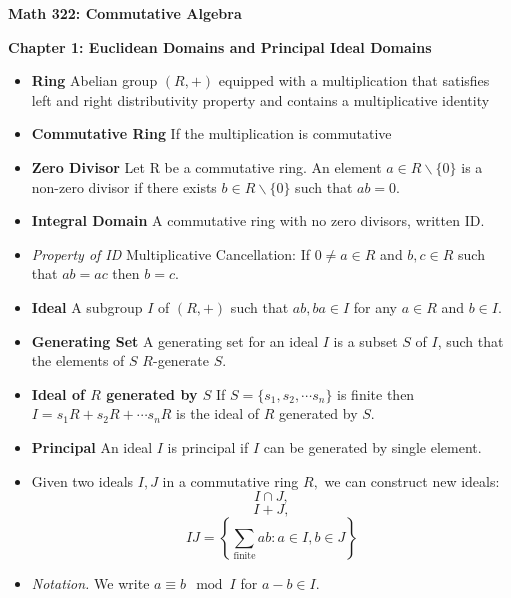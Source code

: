 \documentclass[a4paper, 12pt]
{article}
\begin{document}
	\textbf{Math 322: Commutative Algebra}
	
	\hfill


	\textbf{Chapter 1: Euclidean Domains and Principal Ideal Domains}

	\hfill
	
	\begin{itemize}
		\item \textbf{Ring} Abelian group $(R,+)$ equipped with a multiplication that satisfies left and right distributivity property and contains a  multiplicative identity
		
		\item \textbf{Commutative Ring} If the multiplication is commutative
		
		\item \textbf{Zero Divisor} Let R be a commutative ring. An element $a \in R \backslash \{0\}$ is a non-zero divisor if there exists $b \in R \backslash \{0\}$ such that $ab=0.$
		
		\item \textbf{Integral Domain} A commutative ring with no zero divisors, written ID.  
		
		\item\textit{ Property of ID} Multiplicative Cancellation:
		If $0 \not = a \in R$ and $b,c \in R$ such that $ab=ac$ then $b=c.$
		
		\item \textbf{Ideal} A subgroup $I$ of $(R,+)$ such that $ab, ba \in I$ for any $a \in R$ and $b \in I. $
		
		\item \textbf{Generating Set} A generating set for an ideal $I$ is a subset $S$ of $I$, such that the elements of $S$ $R$-generate $S.$
		
		\item \textbf{Ideal of $R$ generated by $S$} If $S=\{s_1, s_2, \cdots s_n\}$ is finite then $I=s_1R + s_2R + \cdots s_nR$ is the ideal of $R$ generated by $S.$
		
		\item \textbf{Principal} An ideal $I$ is principal if $I$ can be generated by single element.
		
		\item Given two ideals $I,J$ in a commutative ring $R,$ we can construct new ideals: 
		$$I \cap J,$$ 
		$$I+J, $$
		$$IJ=\left\{\sum_\text{finite}ab: a\in I, b\in J\right\}$$
		
		\item\textit{ Notation.} We write $a \equiv b \mod I$ for $a-b \in I.$
		

\end{itemize}
\end{document}
